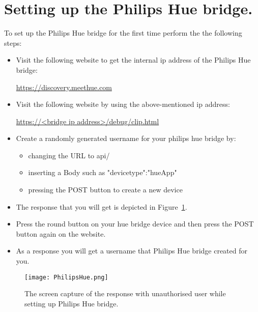 \section{Setting up the Philips Hue bridge.}
\label{sec:setting-up-the-philips-hue-bridge.}
To set up the Philips Hue bridge for the first time perform the the following steps:
\begin{itemize}
    \item Visit the following website to get the internal ip address of the Philips Hue bridge:

    \url{https://discovery.meethue.com}
    \item Visit the following website by using the above-mentioned ip address:

    \url{https://<bridge ip address>/debug/clip.html}
    \item Create a randomly generated username for your philips hue bridge by:
    \begin{itemize}
        \item changing the URL to api/
        \item inserting a Body such as {"devicetype":"hueApp"}
        \item pressing the POST button to create a new device
    \end{itemize}
    \item The response that you will get is depicted in Figure~\ref{fig:PhilipsHue}.
    \item Press the round button on your hue bridge device and then press the POST button again on the website.
    \item As a response you will get a username that Philips Hue bridge created for you.
\end{itemize}

\begin{figure}[hbt!]
    \centering
    \texttt{[image: PhilipsHue.png]}
    \caption{The screen capture of the response with unauthorised user while setting up Philips Hue bridge.}
    \label{fig:PhilipsHue}
\end{figure}
